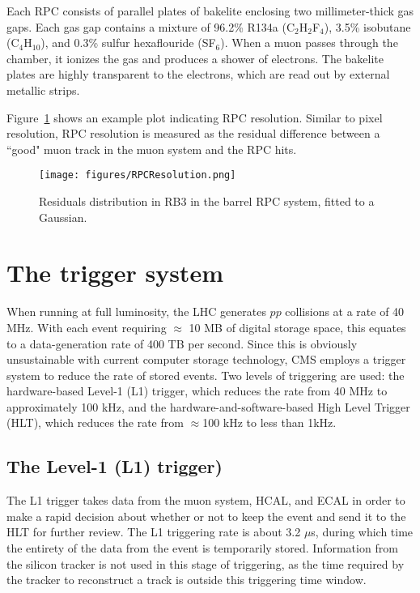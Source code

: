 Each RPC consists of parallel plates of bakelite enclosing two millimeter-thick gas gaps. Each gas gap contains a mixture of 96.2\% R134a (C$_2$H$_2$F$_4$), 3.5\% isobutane (C$_4$H$_10$), and 0.3\% sulfur hexaflouride (SF$_6$). When a muon passes through the chamber, it ionizes the gas and produces a shower of electrons. The bakelite plates are highly transparent to the electrons, which are read out by external metallic strips.

Figure~\ref{fig:RPCResolution} shows an example plot indicating RPC resolution. Similar to pixel resolution, RPC resolution is measured as the residual difference between a ``good" muon track in the muon system and the RPC hits.\cite{Muon}

\begin{figure}\centering
  \texttt{[image: figures/RPCResolution.png]}
  \caption{\label{fig:RPCResolution} Residuals distribution in RB3 in the barrel RPC system, fitted to a Gaussian.}
\end{figure}


\section{The trigger system}

When running at full luminosity, the LHC generates $pp$ collisions at a rate of 40 MHz. With each event requiring $\approx$ 10 MB of digital storage space, this equates to a data-generation rate of 400 TB per second. Since this is obviously unsustainable with current computer storage technology, CMS employs a trigger system to reduce the rate of stored events. Two levels of triggering are used: the hardware-based Level-1 (L1) trigger, which reduces the rate from 40 MHz to approximately 100 kHz, and the hardware-and-software-based High Level Trigger (HLT), which reduces the rate from $\approx$100 kHz to less than 1kHz.\cite{TDR}

\subsection{The Level-1 (L1) trigger)}

The L1 trigger takes data from the muon system, HCAL, and ECAL in order to make a rapid decision about whether or not to keep the event and send it to the HLT for further review. The L1 triggering rate is about 3.2 $\mu$s, during which time the entirety of the data from the event is temporarily stored. Information from the silicon tracker is not used in this stage of triggering, as the time required by the tracker to reconstruct a track is outside this triggering time window. 

